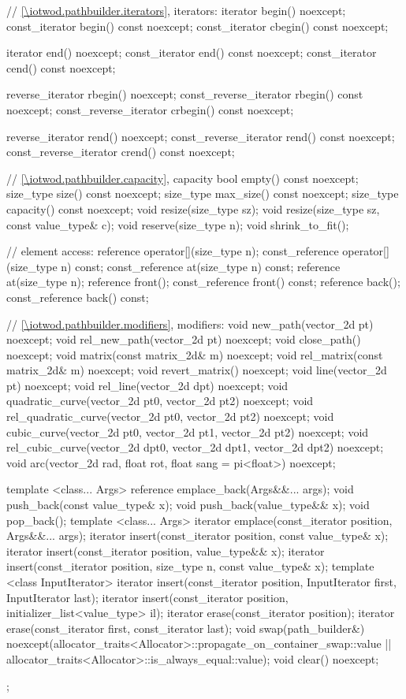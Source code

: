 \begin{codeblock}
{{    // \ref{\iotwod.pathbuilder.iterators}, iterators:
    iterator begin() noexcept;
    const_iterator begin() const noexcept;
    const_iterator cbegin() const noexcept;

    iterator end() noexcept;
    const_iterator end() const noexcept;
    const_iterator cend() const noexcept;
    
    reverse_iterator rbegin() noexcept;
    const_reverse_iterator rbegin() const noexcept;
    const_reverse_iterator crbegin() const noexcept;

    reverse_iterator rend() noexcept;
    const_reverse_iterator rend() const noexcept;
    const_reverse_iterator crend() const noexcept;
    
    // \ref{\iotwod.pathbuilder.capacity}, capacity
    bool empty() const noexcept;
    size_type size() const noexcept;
    size_type max_size() const noexcept;
    size_type capacity() const noexcept;
    void resize(size_type sz);
    void resize(size_type sz, const value_type& c);
    void reserve(size_type n);
    void shrink_to_fit();

    // element access:
    reference operator[](size_type n);
    const_reference operator[](size_type n) const;
    const_reference at(size_type n) const;
    reference at(size_type n);
    reference front();
    const_reference front() const;
    reference back();
    const_reference back() const;

    // \ref{\iotwod.pathbuilder.modifiers}, modifiers:
    void new_path(vector_2d pt) noexcept;
    void rel_new_path(vector_2d pt) noexcept;
    void close_path() noexcept;
    void matrix(const matrix_2d& m) noexcept;
    void rel_matrix(const matrix_2d& m) noexcept;
    void revert_matrix() noexcept;
    void line(vector_2d pt) noexcept;
    void rel_line(vector_2d dpt) noexcept;
    void quadratic_curve(vector_2d pt0, vector_2d pt2)
      noexcept;
    void rel_quadratic_curve(vector_2d pt0, vector_2d pt2)
      noexcept;
    void cubic_curve(vector_2d pt0, vector_2d pt1,
      vector_2d pt2) noexcept;
    void rel_cubic_curve(vector_2d dpt0, vector_2d dpt1,
      vector_2d dpt2) noexcept;
    void arc(vector_2d rad, float rot, float sang = pi<float>)
      noexcept;
    
    template <class... Args>
    reference emplace_back(Args&&... args);
    void push_back(const value_type& x);
    void push_back(value_type&& x);
    void pop_back();
    template <class... Args>
    iterator emplace(const_iterator position, Args&&... args);
    iterator insert(const_iterator position, const value_type& x);
    iterator insert(const_iterator position, value_type&& x);
    iterator insert(const_iterator position, size_type n, const value_type& x);
    template <class InputIterator>
    iterator insert(const_iterator position, InputIterator first,
      InputIterator last);
    iterator insert(const_iterator position,
      initializer_list<value_type> il);
    iterator erase(const_iterator position);
    iterator erase(const_iterator first, const_iterator last);
    void swap(path_builder&)
      noexcept(allocator_traits<Allocator>::propagate_on_container_swap::value 
        || allocator_traits<Allocator>::is_always_equal::value);
    void clear() noexcept;
  };
  
}
\end{codeblock}
